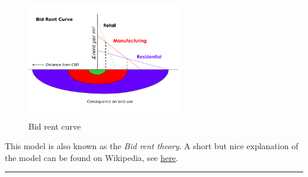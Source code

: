 \documentclass[
  12pt,
  oneside]{book}
\theoremstyle{definition}
\theoremstyle{definition}
\theoremstyle{definition}
\theoremstyle{definition}
\theoremstyle{remark}
\begin{document}
\begin{figure}
\centering
\includegraphics[width=0.6\textwidth,height=\textheight]{fig/Bid_rent1.png}
\caption[\label{fig:thuenen2} Bid rent curve]{\label{fig:thuenen2} Bid rent curve\footnotemark{}}
\end{figure}

This model is also known as the \emph{Bid rent theory}. A short but nice explanation of the model can be found on Wikipedia, see \href{https://en.wikipedia.org/wiki/Bid_rent_theory}{here}.

\begin{center}\rule{0.5\linewidth}{0.5pt}\end{center}
\end{document}
